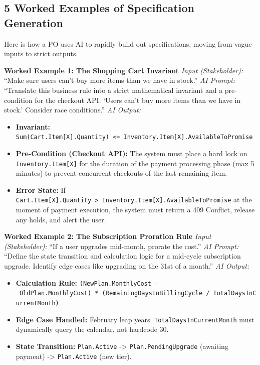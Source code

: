 \subsection{5 Worked Examples of Specification
Generation}\label{worked-examples-of-specification-generation}

Here is how a PO uses AI to rapidly build out specifications, moving
from vague inputs to strict outputs.

\textbf{Worked Example 1: The Shopping Cart Invariant} \emph{Input
(Stakeholder):} ``Make sure users can't buy more items than we have in
stock.'' \emph{AI Prompt:} ``Translate this business rule into a strict
mathematical invariant and a pre-condition for the checkout API: `Users
can't buy more items than we have in stock.' Consider race conditions.''
\emph{AI Output:}

\begin{itemize}
\tightlist
\item
  \textbf{Invariant:}
  \texttt{Sum(Cart.Item{[}X{]}.Quantity)\ \textless{}=\ Inventory.Item{[}X{]}.AvailableToPromise}
\item
  \textbf{Pre-Condition (Checkout API):} The system must place a hard
  lock on \texttt{Inventory.Item{[}X{]}} for the duration of the payment
  processing phase (max 5 minutes) to prevent concurrent checkouts of
  the last remaining item.
\item
  \textbf{Error State:} If
  \texttt{Cart.Item{[}X{]}.Quantity\ \textgreater{}\ Inventory.Item{[}X{]}.AvailableToPromise}
  at the moment of payment execution, the system must return a 409
  Conflict, release any holds, and alert the user.
\end{itemize}

\textbf{Worked Example 2: The Subscription Proration Rule} \emph{Input
(Stakeholder):} ``If a user upgrades mid-month, prorate the cost.''
\emph{AI Prompt:} ``Define the state transition and calculation logic
for a mid-cycle subscription upgrade. Identify edge cases like upgrading
on the 31st of a month.'' \emph{AI Output:}

\begin{itemize}
\tightlist
\item
  \textbf{Calculation Rule:}
  \texttt{(NewPlan.MonthlyCost\ -\ OldPlan.MonthlyCost)\ *\ (RemainingDaysInBillingCycle\ /\ TotalDaysInCurrentMonth)}
\item
  \textbf{Edge Case Handled:} February leap years.
  \texttt{TotalDaysInCurrentMonth} must dynamically query the calendar,
  not hardcode 30.
\item
  \textbf{State Transition:} \texttt{Plan.Active} -\textgreater{}
  \texttt{Plan.PendingUpgrade} (awaiting payment) -\textgreater{}
  \texttt{Plan.Active} (new tier).
\end{itemize}

